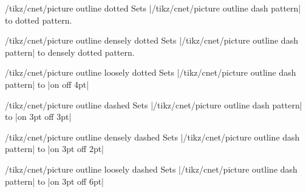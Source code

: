 \documentclass[a4paper]{ltxdoc}
\begin{document}
\begin{stylekey}{/tikz/cnet/picture outline dotted}
  Sets |/tikz/cnet/picture outline dash pattern| to dotted pattern.
\begin{codeexample}[]
\end{codeexample}
\end{stylekey}

\begin{stylekey}{/tikz/cnet/picture outline densely dotted}
  Sets |/tikz/cnet/picture outline dash pattern| to densely dotted pattern.
\begin{codeexample}[]
\end{codeexample}
\end{stylekey}

\begin{stylekey}{/tikz/cnet/picture outline loosely dotted}
  Sets |/tikz/cnet/picture outline dash pattern| to |on \pgflinewidth off 4pt|
\end{stylekey}

\begin{stylekey}{/tikz/cnet/picture outline dashed}
  Sets |/tikz/cnet/picture outline dash pattern| to |on 3pt off 3pt|
\end{stylekey}

\begin{stylekey}{/tikz/cnet/picture outline densely dashed}
  Sets |/tikz/cnet/picture outline dash pattern| to |on 3pt off 2pt|
\end{stylekey}

\begin{stylekey}{/tikz/cnet/picture outline loosely dashed}
  Sets |/tikz/cnet/picture outline dash pattern| to |on 3pt off 6pt|
\end{stylekey}
\end{document}
